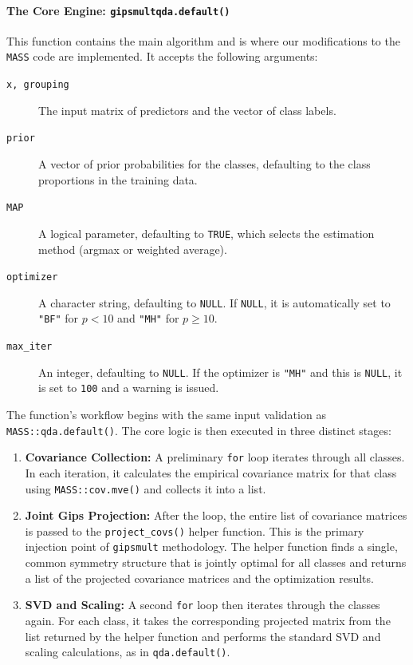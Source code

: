 \documentclass[a4paper,11pt,twoside]{report}
\theoremstyle{definition}
\begin{document}
\paragraph{The Core Engine: \texttt{gipsmultqda.default()}}
This function contains the main algorithm and is where our modifications to the \texttt{MASS} code are implemented. It accepts the following arguments:
\begin{description}
    \item[\texttt{x, grouping}] The input matrix of predictors and the vector of class labels.
    \item[\texttt{prior}] A vector of prior probabilities for the classes, defaulting to the class proportions in the training data.
    \item[\texttt{MAP}] A logical parameter, defaulting to \texttt{TRUE}, which selects the estimation method (argmax or weighted average).
    \item[\texttt{optimizer}] A character string, defaulting to \texttt{NULL}. If \texttt{NULL}, it is automatically set to \texttt{"BF"} for $p < 10$ and \texttt{"MH"} for $p \ge 10$.
    \item[\texttt{max\_iter}] An integer, defaulting to \texttt{NULL}. If the optimizer is \texttt{"MH"} and this is \texttt{NULL}, it is set to \texttt{100} and a warning is issued.
\end{description}
The function's workflow begins with the same input validation as \texttt{MASS::qda.default()}. The core logic is then executed in three distinct stages:
\begin{enumerate}
    \item \textbf{Covariance Collection:} A preliminary \texttt{for} loop iterates through all classes. In each iteration, it calculates the empirical covariance matrix for that class using \texttt{MASS::cov.mve()} and collects it into a list.
    \item \textbf{Joint Gips Projection:} After the loop, the entire list of covariance matrices is passed to the \texttt{project\_covs()} helper function. This is the primary injection point of \texttt{gipsmult} methodology. The helper function finds a single, common symmetry structure that is jointly optimal for all classes and returns a list of the projected covariance matrices and the optimization results.
    \item \textbf{SVD and Scaling:} A second \texttt{for} loop then iterates through the classes again. For each class, it takes the corresponding projected matrix from the list returned by the helper function and performs the standard SVD and scaling calculations, as in \texttt{qda.default()}.
\end{enumerate}
\end{document}
